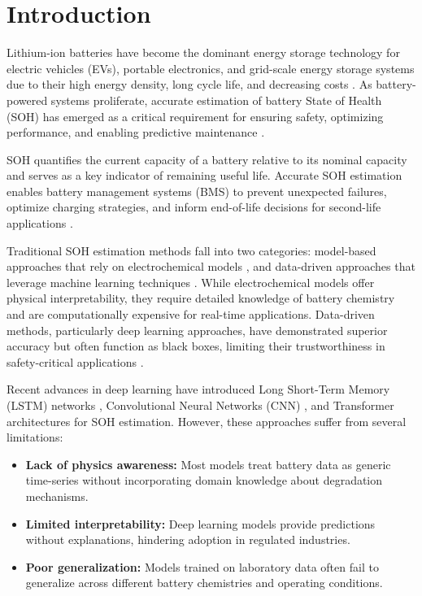 \documentclass[conference]{IEEEtran}
\begin{document}
\section{Introduction}

Lithium-ion batteries have become the dominant energy storage technology for electric vehicles (EVs), portable electronics, and grid-scale energy storage systems due to their high energy density, long cycle life, and decreasing costs \cite{severson2019}. As battery-powered systems proliferate, accurate estimation of battery State of Health (SOH) has emerged as a critical requirement for ensuring safety, optimizing performance, and enabling predictive maintenance \cite{zhao2021}.

SOH quantifies the current capacity of a battery relative to its nominal capacity and serves as a key indicator of remaining useful life. Accurate SOH estimation enables battery management systems (BMS) to prevent unexpected failures, optimize charging strategies, and inform end-of-life decisions for second-life applications \cite{zhang2018}.

Traditional SOH estimation methods fall into two categories: model-based approaches that rely on electrochemical models \cite{han2014}, and data-driven approaches that leverage machine learning techniques \cite{widodo2011}. While electrochemical models offer physical interpretability, they require detailed knowledge of battery chemistry and are computationally expensive for real-time applications. Data-driven methods, particularly deep learning approaches, have demonstrated superior accuracy but often function as black boxes, limiting their trustworthiness in safety-critical applications \cite{hong2020}.

Recent advances in deep learning have introduced Long Short-Term Memory (LSTM) networks \cite{zhang2018}, Convolutional Neural Networks (CNN) \cite{li2019}, and Transformer architectures \cite{song2022} for SOH estimation. However, these approaches suffer from several limitations:

\begin{itemize}
    \item \textbf{Lack of physics awareness:} Most models treat battery data as generic time-series without incorporating domain knowledge about degradation mechanisms.
    \item \textbf{Limited interpretability:} Deep learning models provide predictions without explanations, hindering adoption in regulated industries.
    \item \textbf{Poor generalization:} Models trained on laboratory data often fail to generalize across different battery chemistries and operating conditions.
\end{itemize}
\end{document}

